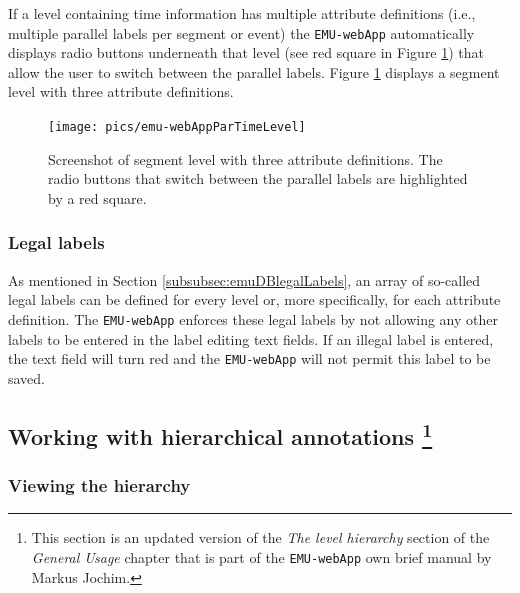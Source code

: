 \documentclass[]{book}
\let\rmarkdownfootnote\footnote%
\def\footnote{\protect\rmarkdownfootnote}
\begin{document}
If a level containing time information has multiple attribute definitions (i.e., multiple parallel labels per segment or event) the \texttt{EMU-webApp} automatically displays radio buttons underneath that level (see red square in Figure \ref{fig:webApp-parTimeLevel}) that allow the user to switch between the parallel labels. Figure \ref{fig:webApp-parTimeLevel} displays a segment level with three attribute definitions.

\begin{figure}

{\centering \texttt{[image: pics/emu-webAppParTimeLevel]} 

}

\caption{Screenshot of segment level with three attribute definitions. The radio buttons that switch between the parallel labels are highlighted by a red square.}\label{fig:webApp-parTimeLevel}
\end{figure}

\hypertarget{legal-labels}{%
\subsubsection{Legal labels}\label{legal-labels}}

As mentioned in Section \ref{subsubsec:emuDBlegalLabels}, an array of so-called legal labels can be defined for every level or, more specifically, for each attribute definition. The \texttt{EMU-webApp} enforces these legal labels by not allowing any other labels to be entered in the label editing text fields. If an illegal label is entered, the text field will turn red and the \texttt{EMU-webApp} will not permit this label to be saved.

\hypertarget{working-with-hierarchical-annotations-2-chapemu-webapp}{%
\subsection[Working with hierarchical annotations ]{\texorpdfstring{Working with hierarchical annotations \footnote{This section is an updated version of the \emph{The level hierarchy} section of the \emph{General Usage} chapter that is part of the \texttt{EMU-webApp} own brief manual by Markus Jochim.}}{Working with hierarchical annotations }}\label{working-with-hierarchical-annotations-2-chapemu-webapp}}

\hypertarget{viewing-the-hierarchy}{%
\subsubsection{Viewing the hierarchy}\label{viewing-the-hierarchy}}
\end{document}
